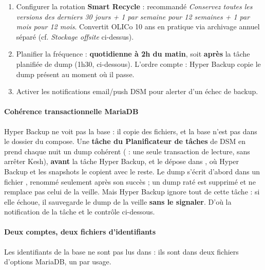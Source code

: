 \documentclass[a4paper,11pt,oneside]{article}
\begin{document}
\begin{enumerate}
    \item Configurer la rotation \textbf{Smart Recycle} : recommandé \emph{Conservez toutes les versions des derniers 30 jours + 1 par semaine pour 12 semaines + 1 par mois pour 12 mois}. Convertit OLICo 10 ans en pratique via archivage annuel séparé (cf. \emph{Stockage offsite} ci-dessus).
    \item Planifier la fréquence : \textbf{quotidienne à 2h du matin}, soit \textbf{après} la tâche planifiée de dump (1h30, ci-dessous). L'ordre compte : Hyper Backup copie le dump présent au moment où il passe.
    \item Activer les notifications email/push DSM pour alerter d'un échec de backup.
\end{enumerate}

\paragraph{Cohérence transactionnelle MariaDB}

Hyper Backup ne voit pas la base : il copie des fichiers, et la base n'est pas dans le dossier du compose. Une \textbf{tâche du Planificateur de tâches} de DSM en prend chaque nuit un dump cohérent ( : une seule transaction de lecture, sans arrêter Kesh), \textbf{avant} la tâche Hyper Backup, et le dépose dans , où Hyper Backup et les snapshots le copient avec le reste. Le dump s'écrit d'abord dans un fichier , renommé seulement après son succès ; un dump raté est supprimé et ne remplace pas celui de la veille. Mais Hyper Backup ignore tout de cette tâche : si elle échoue, il sauvegarde le dump de la veille \textbf{sans le signaler}. D'où la notification de la tâche et le contrôle ci-dessous.

\paragraph{Deux comptes, deux fichiers d'identifiants}

Les identifiants de la base ne sont pas lus dans  : ils sont dans deux fichiers d'options MariaDB, un par usage.
\end{document}
